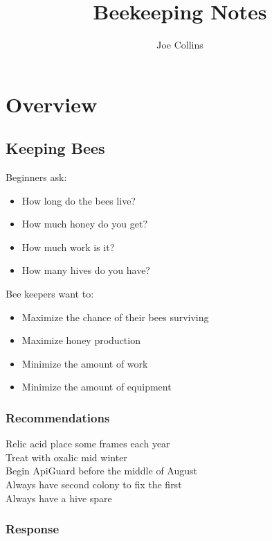 \documentclass{./BeekeepingBook}
\title{Beekeeping Notes}
\author{Joe Collins}
\date{\DTMnow}
\begin{document}
 
\maketitle
\tableofcontents

\chapter{Overview}

\section*{Keeping Bees}

Beginners ask:

\begin{itemize}
  \item How long do the bees live?
  \item How much honey do you get?
  \item How much work is it?
  \item How many hives do you have?
\end{itemize}

Bee keepers want to:

\begin{itemize}
  \item Maximize the chance of their bees surviving
  \item Maximize honey production
  \item Minimize the amount of work
  \item Minimize the amount of equipment
\end{itemize}

\subsection*{Recommendations}

\begin{description}
  \item[Relic acid place some frames each year]
  \item[Treat with oxalic mid winter]
  \item[Begin ApiGuard before the middle of August]
  \item[Always have second colony to fix the first]
  \item[Always have a hive spare]
\end{description}

\subsection*{Response}
\end{document}
